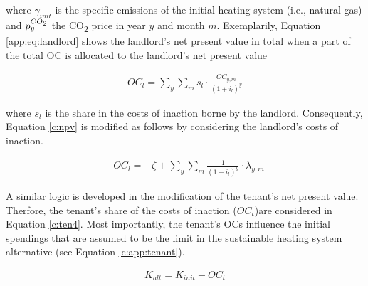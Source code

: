 \documentclass[review]{elsarticle}
\begin{document}
where $\gamma_{init}$ is the specific emissions of the initial heating system (i.e., natural gas) and $p_{y}^{CO\textsubscript{2}}$ the CO\textsubscript{2} price in year $y$ and month $m$. Exemplarily, Equation \ref{app:eq:landlord} shows the landlord's net present value in total when a part of the total OC is allocated to the landlord's net present value

\begin{align}\label{app:eq:landlord}
	OC_{l} =  \sum_{y} \sum_{m} s_l \cdot \frac{OC_{y,m}}{(1+i_l)^y} 
\end{align}

where $s_l$ is the share in the costs of inaction borne by the landlord. Consequently, Equation \ref{c:npv} is modified as follows by considering the landlord's costs of inaction.

\begin{align}\label{app:eq:landlord}
	-OC_{l} =  -\zeta + \sum_{y} \sum_{m} \frac{1}{(1+i_l)^y} \cdot \lambda_{y,m}
\end{align}

A similar logic is developed in the modification of the tenant's net present value. Therfore, the tenant's share of the costs of inaction ($OC_{t}$)are considered in Equation \ref{c:ten4}. Most importantly, the tenant's OCs influence the initial spendings that are assumed to be the limit in the sustainable heating system alternative (see Equation \ref{c:app:tenant}).

\begin{align}\label{c:app:tenant}
	K_{alt} = K_{init} - OC_{t}
\end{align}
\end{document}
